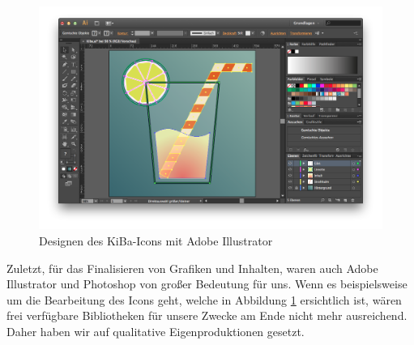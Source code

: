 \begin{figure}[hb]
	\centering
	\includegraphics[scale=.3]{Pictures/IllustratorIcon}
	\vspace{-.8cm}
	\caption{Designen des KiBa-Icons mit Adobe Illustrator\label{fig:IllustratorIcon}}
\end{figure}

	Zuletzt, für das Finalisieren von Grafiken und Inhalten, waren auch Adobe Illustrator und Photoshop von großer Bedeutung für uns. Wenn es beispielsweise um die Bearbeitung des Icons geht, welche in Abbildung \ref{fig:IllustratorIcon} ersichtlich ist, wären frei verfügbare Bibliotheken für unsere Zwecke am Ende nicht mehr ausreichend. Daher haben wir auf qualitative Eigenproduktionen gesetzt.
